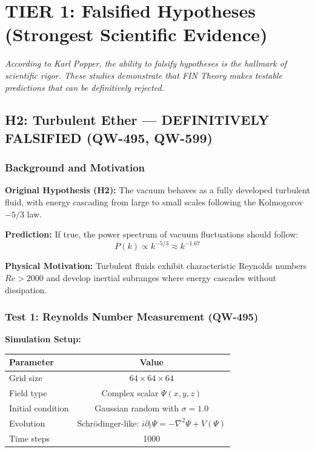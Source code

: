 \documentclass[11pt, a4paper]{article}
\theoremstyle{remark}
\begin{document}
\section{TIER 1: Falsified Hypotheses (Strongest Scientific Evidence)}

\textit{According to Karl Popper, the ability to falsify hypotheses is the hallmark of scientific rigor. These studies demonstrate that FIN Theory makes testable predictions that can be definitively rejected.}

\subsection{H2: Turbulent Ether --- DEFINITIVELY FALSIFIED (QW-495, QW-599)}

\subsubsection{Background and Motivation}

\textbf{Original Hypothesis (H2):} The vacuum behaves as a fully developed turbulent fluid, with energy cascading from large to small scales following the Kolmogorov $-5/3$ law.

\textbf{Prediction:} If true, the power spectrum of vacuum fluctuations should follow:
\begin{equation}
P(k) \propto k^{-5/3} \approx k^{-1.67}
\end{equation}

\textbf{Physical Motivation:} Turbulent fluids exhibit characteristic Reynolds numbers $Re > 2000$ and develop inertial subranges where energy cascades without dissipation.

\subsubsection{Test 1: Reynolds Number Measurement (QW-495)}

\textbf{Simulation Setup:}
\begin{table}[H]
\centering
\begin{tabular}{|l|c|}
\hline
\textbf{Parameter} & \textbf{Value} \\
\hline
Grid size & $64 \times 64 \times 64$ \\
Field type & Complex scalar $\Psi(x,y,z)$ \\
Initial condition & Gaussian random with $\sigma = 1.0$ \\
Evolution & Schrödinger-like: $i\partial_t\Psi = -\nabla^2\Psi + V(\Psi)$ \\
Time steps & 1000 \\
\hline
\end{tabular}
\end{table}
\end{document}
